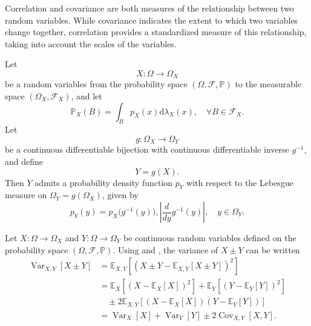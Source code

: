 \begin{remark}
	Correlation and covariance are both measures of the relationship between two random variables. While covariance indicates the extent to which two variables change together, correlation provides a standardized measure of this relationship, taking into account the scales of the variables.
\end{remark}

\begin{definition}
	\label{def:change_of_variables}
	Let
	\begin{equation}
		X\colon \Omega \to \Omega_X
	\end{equation}
	be a random variables from the probability space $(\Omega, \mathcal{F}, \mathbb{P})$ to the measurable space $(\Omega_X, \mathcal{F}_X)$, and let 
	\begin{equation}
		\mathbb{P}_X(B) = \int_B p_X(x)\mathrm{d}\lambda_X(x), \quad \forall B\in \mathcal{F}_X.
	\end{equation}
	Let
	\begin{equation}
		g\colon \Omega_X\to \Omega_Y
	\end{equation}
	be a continuous differentiable bijection with continuous differentiable inverse $g^{-1}$, and define
	\begin{equation}
		Y= g(X).
	\end{equation}
	Then $Y$ admits a probability density function $p_Y$ with respect to the Lebesgue measure on $\Omega_Y = g(\Omega_X)$, given by~\cite{Sivia2006}
	\begin{equation}
		p_Y(y) = p_X\bigl(g^{-1}(y)\bigr), \left| \frac{d}{dy} g^{-1}(y) \right|, \quad y \in \Omega_Y.
	\end{equation}
\end{definition}

\newpage
\begin{example}
	Let $X\colon \Omega \to \Omega_X$ and $Y\colon\Omega \to \Omega_Y$ be continuous random variables defined on the probability space $(\Omega, \mathcal{F}, \mathbb{P})$. Using  and , the variance of $X\pm Y$ can be written
	\begin{equation}
		\begin{split}
			\operatorname{Var}_{X,Y}[X\pm Y] &= \mathbb{E}_{X,Y}[(X\pm Y-\mathbb{E}_{X,Y}[X \pm Y])^2]\\
			&= \mathbb{E}_X[(X-\mathbb{E}_X[X])^2]+\mathbb{E}_Y[(Y-\mathbb{E}_Y[Y])^2]\\
			&\quad\pm2\mathbb{E}_{X,Y}[(X-\mathbb{E}_X[X])(Y-\mathbb{E}_Y[Y])]\\
			& = \operatorname{Var}_X[X]+\operatorname{Var}_Y[Y]\pm2\operatorname{Cov}_{X,Y}[X,Y].
		\end{split}
	\end{equation}
\end{example}

